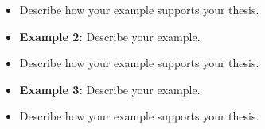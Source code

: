 \begin{enumerate}
\begin{spacing}{1.5}
\begin{itemize}
\hrulefill

\item Describe how your example supports your thesis. \hrulefill

\hrulefill

\item \textbf{Example 2:} Describe your example. \hrulefill

\hrulefill

\item Describe how your example supports your thesis. \hrulefill

\hrulefill

\item \textbf{Example 3:} Describe your example. \hrulefill

\hrulefill

\item Describe how your example supports your thesis. \hrulefill

\hrulefill
\end{itemize}
\end{spacing}
\end{enumerate}